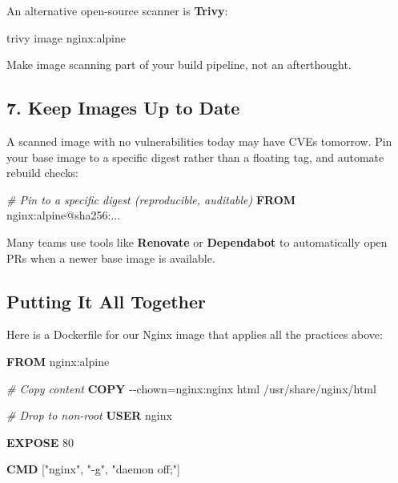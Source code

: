 \documentclass[11pt,american,a4paper,openany]{book}
\newenvironment{Shaded}{}{}
\newcommand{\CommentTok}[1]{\textcolor[rgb]{0.38,0.63,0.69}{\textit{#1}}}
\newcommand{\KeywordTok}[1]{\textcolor[rgb]{0.00,0.44,0.13}{\textbf{#1}}}
\newcommand{\NormalTok}[1]{#1}
\newcommand{\OperatorTok}[1]{\textcolor[rgb]{0.40,0.40,0.40}{#1}}
\newcommand{\StringTok}[1]{\textcolor[rgb]{0.25,0.44,0.63}{#1}}
\begin{document}
An alternative open-source scanner is \textbf{Trivy}:

\begin{Shaded}
\begin{Highlighting}[]
\NormalTok{trivy image nginx:alpine}
\end{Highlighting}
\end{Shaded}

Make image scanning part of your build pipeline, not an afterthought.

\subsection{7. Keep Images Up to Date}\label{keep-images-up-to-date}

A scanned image with no vulnerabilities today may have CVEs tomorrow.
Pin your base image to a specific digest rather than a floating tag, and
automate rebuild checks:

\begin{Shaded}
\begin{Highlighting}[]
\CommentTok{\# Pin to a specific digest (reproducible, auditable)}
\KeywordTok{FROM}\NormalTok{ nginx:alpine@sha256:...}
\end{Highlighting}
\end{Shaded}

Many teams use tools like \textbf{Renovate} or \textbf{Dependabot} to
automatically open PRs when a newer base image is available.

\subsection{Putting It All Together}\label{putting-it-all-together}

Here is a Dockerfile for our Nginx image that applies all the practices
above:

\begin{Shaded}
\begin{Highlighting}[]
\KeywordTok{FROM}\NormalTok{ nginx:alpine}

\CommentTok{\# Copy content}
\KeywordTok{COPY} \OperatorTok{{-}{-}chown=nginx:nginx}\NormalTok{ html /usr/share/nginx/html}

\CommentTok{\# Drop to non{-}root}
\KeywordTok{USER}\NormalTok{ nginx}

\KeywordTok{EXPOSE}\NormalTok{ 80}

\KeywordTok{CMD}\NormalTok{ [}\StringTok{"nginx"}\NormalTok{, }\StringTok{"{-}g"}\NormalTok{, }\StringTok{"daemon off;"}\NormalTok{]}
\end{Highlighting}
\end{Shaded}
\end{document}
